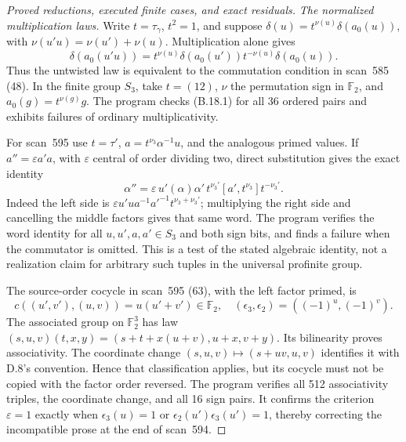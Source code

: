 \begin{proof}[Proved reductions, executed finite cases, and exact residuals]
\emph{The normalized multiplication laws.}
Write \(t=\tau_\gamma\), \(t^2=1\), and suppose
\(\delta(u)=t^{\nu(u)}\delta(a_0(u))\), with
\(\nu(u'u)=\nu(u')+\nu(u)\).  Multiplication alone gives
\[
 \delta(a_0(u'u))=
 t^{\nu(u)}\delta(a_0(u'))t^{-\nu(u)}\delta(a_0(u)).
                                                               \tag{B.18.1}
\]
Thus the untwisted law is equivalent to the commutation
condition in scan~585 (48).  In the finite group \(S_3\),
take \(t=(12)\), \(\nu\) the permutation sign in
\(\mathbb F_2\), and \(a_0(g)=t^{\nu(g)}g\).
The program checks (B.18.1) for all 36 ordered pairs and
exhibits failures of ordinary multiplicativity.

For scan~595 use \(t=\tau'\),
\(a=t^{\nu_3}\alpha^{-1}u\), and the analogous primed
values.  If \(a''=\varepsilon a'a\), with
\(\varepsilon\) central of order dividing two, direct
substitution gives the exact identity
\[
 \alpha''=\varepsilon\,u'(\alpha)\alpha'\,
 t^{\nu_3'}[a',t^{\nu_3}]t^{-\nu_3'}.
                                                               \tag{B.18.2}
\]
Indeed the left side is
\(\varepsilon u'u a^{-1}a'^{-1}t^{\nu_3+\nu_3'}\);
multiplying the right side and cancelling the middle factors
gives that same word.  The program verifies the word identity
for all \(u,u',a,a'\in S_3\) and both sign bits, and finds
a failure when the commutator is omitted.  This is a test
of the stated algebraic identity, not a realization claim
for arbitrary such tuples in the universal profinite group.

The source-order cocycle in scan~595 (63), with the left
factor primed, is
\[
 c((u',v'),(u,v))=u(u'+v')\in\mathbb F_2,
 \quad (\epsilon_3,\epsilon_2)=((-1)^u,(-1)^v).
                                                               \tag{B.18.3}
\]
The associated group on \(\mathbb F_2^3\) has law
\((s,u,v)(t,x,y)=(s+t+x(u+v),u+x,v+y)\).
Its bilinearity proves associativity.  The coordinate change
\((s,u,v)\mapsto(s+uv,u,v)\) identifies it with D.8's
convention.  Hence that classification applies, but its
cocycle must not be copied with the factor order reversed.
The program verifies all 512 associativity triples, the
coordinate change, and all 16 sign pairs.  It confirms the
criterion \(\varepsilon=1\) exactly when
\(\epsilon_3(u)=1\) or
\(\epsilon_2(u')\epsilon_3(u')=1\), thereby correcting
the incompatible prose at the end of scan~594.


\end{proof}
